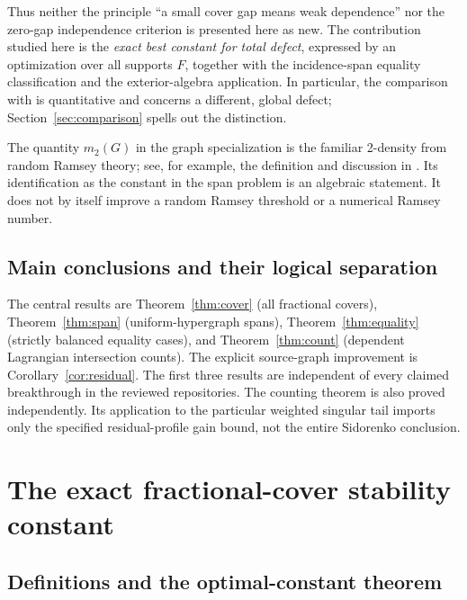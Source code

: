 \documentclass[11pt]{article}
\theoremstyle{definition}
\theoremstyle{remark}
\newcommand{\1}{\mathbf 1}
\begin{document}
Thus neither the principle ``a small cover gap means weak dependence'' nor the
zero-gap independence criterion is presented here as new. The contribution
studied here is the \emph{exact best constant for total defect}, expressed by
an optimization over all supports $F$, together with the incidence-span equality
classification and the exterior-algebra application. In particular, the
comparison with \cite{Jakhar2025} is quantitative and concerns a different,
global defect; Section~\ref{sec:comparison} spells out the distinction.

The quantity $m_2(G)$ in the graph specialization is the familiar 2-density
from random Ramsey theory; see, for example, the definition and discussion in
\cite{RamseyTilings}. Its identification as the constant in the span problem
is an algebraic statement. It does not by itself improve a random Ramsey
threshold or a numerical Ramsey number.

\subsection{Main conclusions and their logical separation}

The central results are Theorem~\ref{thm:cover} (all fractional covers),
Theorem~\ref{thm:span} (uniform-hypergraph spans),
Theorem~\ref{thm:equality} (strictly balanced equality cases), and
Theorem~\ref{thm:count} (dependent Lagrangian intersection counts).
The explicit source-graph improvement is Corollary~\ref{cor:residual}.
The first three results are independent of every claimed breakthrough in the
reviewed repositories. The counting theorem is also proved independently. Its
application to the particular weighted singular tail imports only the
specified residual-profile gain bound, not the entire Sidorenko conclusion.

\section{The exact fractional-cover stability constant}
\label{sec:cover}

\subsection{Definitions and the optimal-constant theorem}
\end{document}
